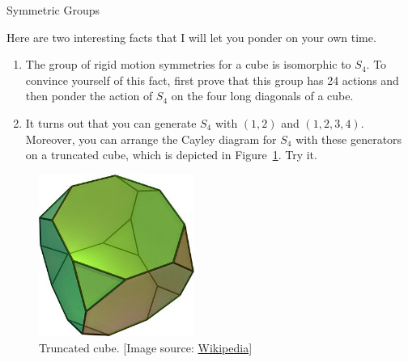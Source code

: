 \begin{section}{Symmetric Groups}
\begin{remark}
Here are two interesting facts that I will let you ponder on your own time.
\begin{enumerate}[label=\rm{(\alph*)}]
\item The group of rigid motion symmetries for a cube is isomorphic to $S_4$.  To convince yourself of this fact, first prove that this group has 24 actions and then ponder the action of $S_4$ on the four long diagonals of a cube.
\item It turns out that you can generate $S_4$ with $(1,2)$ and $(1,2,3,4)$.  Moreover, you can arrange the Cayley diagram for $S_4$ with these generators on a truncated cube, which is depicted in Figure~\ref{fig:TruncatedCube}.  Try it. 
\end{enumerate}
\end{remark}

\begin{figure}[ht!]
\begin{center}
\includegraphics[width=2in]{TruncatedCube.jpg}
\end{center}
\caption{Truncated cube. [Image source: \href{https://en.wikipedia.org/wiki/Truncated_cube}{Wikipedia}]}\label{fig:TruncatedCube}
\end{figure}

\end{section}

